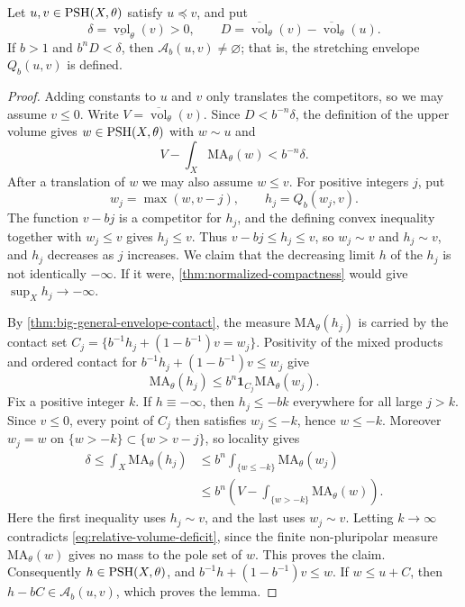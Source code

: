 \begin{lemma}\label{lem:volume-deficit-stretch}
Let $u,v\in\mathrm{PSH}(X,\theta)$ satisfy $u\preceq v$, and put
\[
 \delta=\underline{\operatorname{vol}}_\theta(v)>0,
 \qquad D=\overline{\operatorname{vol}}_\theta(v)
             -\overline{\operatorname{vol}}_\theta(u).
\]
If $b>1$ and $b^nD<\delta$, then $\mathcal A_b(u,v)\neq\varnothing$; that is, the stretching envelope $Q_b(u,v)$ is defined.
\end{lemma}
\begin{proof}
Adding constants to $u$ and $v$ only translates the competitors, so we may assume $v\leq0$. Write $V=\overline{\operatorname{vol}}_\theta(v)$. Since $D<b^{-n}\delta$, the definition of the upper volume gives $w\in\mathrm{PSH}(X,\theta)$ with $w\sim u$ and
\begin{equation}\label{eq:relative-volume-deficit}
 V-\int_X\mathrm{MA}_\theta(w)<b^{-n}\delta.
\end{equation}
After a translation of $w$ we may also assume $w\leq v$. For positive integers $j$, put
\[
 w_j=\max(w,v-j),\qquad h_j=Q_b(w_j,v).
\]
The function $v-bj$ is a competitor for $h_j$, and the defining convex inequality together with $w_j\leq v$ gives $h_j\leq v$. Thus $v-bj\leq h_j\leq v$, so $w_j\sim v$ and $h_j\sim v$, and $h_j$ decreases as $j$ increases. We claim that the decreasing limit $h$ of the $h_j$ is not identically $-\infty$. If it were, \cref{thm:normalized-compactness} would give $\sup_Xh_j\to-\infty$.

By \cref{thm:big-general-envelope-contact}, the measure $\mathrm{MA}_\theta(h_j)$ is carried by the contact set $C_j=\{b^{-1}h_j+(1-b^{-1})v=w_j\}$. Positivity of the mixed products and ordered contact for $b^{-1}h_j+(1-b^{-1})v\leq w_j$ give
\[
 \mathrm{MA}_\theta(h_j)
       \leq b^n\mathbf1_{C_j}\mathrm{MA}_\theta(w_j).
\]
Fix a positive integer $k$. If $h\equiv-\infty$, then $h_j\leq-bk$ everywhere for all large $j>k$. Since $v\leq0$, every point of $C_j$ then satisfies $w_j\leq-k$, hence $w\leq-k$. Moreover $w_j=w$ on $\{w>-k\}\subset\{w>v-j\}$, so locality gives
\[
 \begin{split}
 \delta\leq\int_X\mathrm{MA}_\theta(h_j)
 &\leq b^n\int_{\{w\leq-k\}}\mathrm{MA}_\theta(w_j)\\
 &\leq b^n\left(V-\int_{\{w>-k\}}\mathrm{MA}_\theta(w)\right).
 \end{split}
\]
Here the first inequality uses $h_j\sim v$, and the last uses $w_j\sim v$. Letting $k\to\infty$ contradicts \eqref{eq:relative-volume-deficit}, since the finite non-pluripolar measure $\mathrm{MA}_\theta(w)$ gives no mass to the pole set of $w$. This proves the claim. Consequently $h\in\mathrm{PSH}(X,\theta)$, and $b^{-1}h+(1-b^{-1})v\leq w$. If $w\leq u+C$, then $h-bC\in\mathcal A_b(u,v)$, which proves the lemma.
\end{proof}

